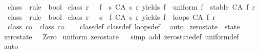 \begin{isabellebody}
%
\isadelimproof
\isanewline
%
\endisadelimproof
\isanewline
\isanewline
{}\isamarkupfalse%
\ class{}\ {\isacharcolon}{\isacharcolon}\ {\isachardoublequoteopen}rule\ {\isasymRightarrow}\ bool{\isachardoublequoteclose}\ \isanewline
{\isachardoublequoteopen}class{}\ r\ {\isasymequiv}\ {\isacharparenleft}{\isasymexists}{\isacharbang}\ f{\isachardot}\ {\isacharparenleft}{\isasymforall}\ s{\isachardot}\ {\isacharparenleft}CA\ s\ r{\isacharparenright}\ yields\ f\ {\isasymand}\ uniform\ f\ {\isasymand}\ stable\ {\isacharparenleft}CA\ f\ r{\isacharparenright}{\isacharparenright}{\isacharparenright}{\isachardoublequoteclose}\isanewline
\isanewline
{}\isamarkupfalse%
\ class{}\ {\isacharcolon}{\isacharcolon}\ {\isachardoublequoteopen}rule\ {\isasymRightarrow}\ bool{\isachardoublequoteclose}\ \isanewline
{\isachardoublequoteopen}class{}\ r\ {\isasymequiv}\ {\isacharparenleft}{\isasymforall}\ s{\isachardot}\ {\isacharparenleft}{\isasymexists}\ f{\isachardot}\ {\isacharparenleft}CA\ s\ r{\isacharparenright}\ yields\ f\ {\isasymand}\ loops\ {\isacharparenleft}CA\ f\ r{\isacharparenright}{\isacharparenright}{\isacharparenright}{\isachardoublequoteclose}\isanewline
\isanewline
{}\isamarkupfalse%
\ {\isachardoublequoteopen}class{}\ ca\ {\isasymLongrightarrow}\ class{}\ ca{\isachardoublequoteclose}\isanewline
%
\isadelimproof
\ \ %
\endisadelimproof
%
\isatagproof
{}\isamarkupfalse%
\ class{}{\isacharunderscore}def\ class{}{\isacharunderscore}def\ loops{\isacharunderscore}def\ \isamarkupfalse%
\ auto%
\endisatagproof
{\isafoldproof}%
%
\isadelimproof
%
\endisadelimproof
%
\isadelimdocument
%
\endisadelimdocument
%
\isatagdocument
%
\isamarkuptrue%
%
\endisatagdocument
{\isafolddocument}%
%
\isadelimdocument
%
\endisadelimdocument
{}\isamarkupfalse%
\ zero{\isacharunderscore}state\ {\isacharcolon}{\isacharcolon}\ state\ \isanewline
{\isachardoublequoteopen}zero{\isacharunderscore}state\ {\isacharunderscore}\ {\isasymequiv}\ Zero{\isachardoublequoteclose}\isanewline
\isanewline
{}\isamarkupfalse%
\ {\isachardoublequoteopen}uniform\ zero{\isacharunderscore}state{\isachardoublequoteclose}\isanewline
%
\isadelimproof
\ \ %
\endisadelimproof
%
\isatagproof
{}\isamarkupfalse%
{\isacharparenleft}simp\ add{\isacharcolon}\ zero{\isacharunderscore}state{\isacharunderscore}def\ uniform{\isacharunderscore}def{\isacharparenright}\isanewline
\ \ \isamarkupfalse%
{\isacharparenleft}auto{\isacharparenright}\isanewline
\ \ \isamarkupfalse%
%
\endisatagproof
{\isafoldproof}%
%
\isadelimproof
\isanewline
%
\endisadelimproof
%
\isadelimtheory
%
\endisadelimtheory
%
\isatagtheory
{}\isamarkupfalse%
%
\endisatagtheory
{\isafoldtheory}%
%
\isadelimtheory
%
\endisadelimtheory
%
\end{isabellebody}%

